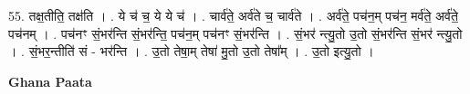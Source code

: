 \documentclass[17pt]{extarticle}
\begin{document}
55. तक्ष॒तीति॒ तक्ष॑ति । . ये च॑ च॒ ये ये च॑ । . चार्व॑ते॒ अर्व॑ते च॒ चार्व॑ते । . अर्व॑ते॒ पच॑न॒म् पच॑न॒ मर्व॑ते॒ अर्व॑ते॒ पच॑नम् । . पच॑नꣳ सं॒भर॑न्ति सं॒भर॑न्ति॒ पच॑न॒म् पच॑नꣳ सं॒भर॑न्ति । . सं॒भर॑ न्त्यु॒तो उ॒तो सं॒भर॑न्ति सं॒भर॑ न्त्यु॒तो । . सं॒भर॒न्तीति॑ सं - भर॑न्ति । . उ॒तो तेषा॒म् तेषा॑ मु॒तो उ॒तो तेषा᳚म् । . उ॒तो इत्यु॒तो । \newline

\textbf{Ghana Paata } \newline
\end{document}
